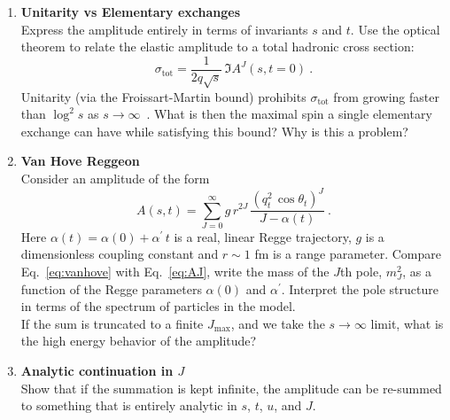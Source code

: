 \begin{enumerate}
    \item \textbf{Unitarity vs Elementary exchanges} \\
          Express the amplitude entirely in terms of invariants $s$ and $t$. Use the optical theorem to relate the elastic amplitude to a total hadronic cross section:
          \begin{equation}
              \sigma_\text{tot} = \frac{1}{2q\sqrt{s}} \, \Im A^J(s,t=0)~.
          \end{equation}
          Unitarity (via the Froissart-Martin bound) prohibits $\sigma_\text{tot}$ from growing faster than $\log^2 s$ as $s\to\infty$~. What is then the maximal spin a single elementary exchange can have while satisfying this bound? Why is this a problem?

    \item \textbf{Van Hove Reggeon} \\
          Consider an amplitude of the form
          \begin{equation}
              \label{eq:vanhove}
              A(s,t) = \sum_{J=0}^\infty g \, r^{2J} \, \frac{ (q_t^2 \, \cos\theta_t)^J}{J- \alpha(t)} ~.
          \end{equation}
          Here $\alpha(t) = \alpha(0) + \alpha^\prime \, t$ is a real, linear Regge trajectory, $g$ is a dimensionless coupling constant and $r \sim 1$ fm is a range parameter.
          Compare Eq.~\ref{eq:vanhove} with Eq.~\ref{eq:AJ}, write the mass of the $J$th pole, $m_J^2$, as a function of the Regge parameters $\alpha(0)$ and $\alpha^\prime$. Interpret the pole structure in terms of the spectrum of particles in the model.
          \\

          \noindent If the sum is truncated to a finite $J_\text{max}$, and we take the $s\to \infty$ limit, what is the high energy behavior of the amplitude?

    \item \textbf{Analytic continuation in $J$} \\
          Show that if the summation is kept infinite, the amplitude can be re-summed to something that is entirely analytic in $s$, $t$, $u$, and $J$.


\end{enumerate}
